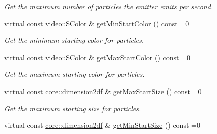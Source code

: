 \begin{DoxyCompactItemize}
\begin{DoxyCompactList}\small\item\em Get the maximum number of particles the emitter emits per second. \end{DoxyCompactList}\item 
\mbox{\label{classirr_1_1scene_1_1IParticleEmitter_a919f23add74b59c88a6c72b417d187e2}} 
virtual const \hyperlink{classirr_1_1video_1_1SColor}{video\+::\+S\+Color} \& \hyperlink{classirr_1_1scene_1_1IParticleEmitter_a919f23add74b59c88a6c72b417d187e2}{get\+Min\+Start\+Color} () const =0
\begin{DoxyCompactList}\small\item\em Get the minimum starting color for particles. \end{DoxyCompactList}\item 
\mbox{\label{classirr_1_1scene_1_1IParticleEmitter_a898736e31071bb5bfdb806e4c892eb01}} 
virtual const \hyperlink{classirr_1_1video_1_1SColor}{video\+::\+S\+Color} \& \hyperlink{classirr_1_1scene_1_1IParticleEmitter_a898736e31071bb5bfdb806e4c892eb01}{get\+Max\+Start\+Color} () const =0
\begin{DoxyCompactList}\small\item\em Get the maximum starting color for particles. \end{DoxyCompactList}\item 
\mbox{\label{classirr_1_1scene_1_1IParticleEmitter_a89a84536dc2ddc0df4ec831f9367b187}} 
virtual const \hyperlink{namespaceirr_1_1core_a54f0e5b7416e6dce5a0f6213f00a580f}{core\+::dimension2df} \& \hyperlink{classirr_1_1scene_1_1IParticleEmitter_a89a84536dc2ddc0df4ec831f9367b187}{get\+Max\+Start\+Size} () const =0
\begin{DoxyCompactList}\small\item\em Get the maximum starting size for particles. \end{DoxyCompactList}\item 
\mbox{\label{classirr_1_1scene_1_1IParticleEmitter_a97ddc124d93f83164aa49f7b6370bc8f}} 
virtual const \hyperlink{namespaceirr_1_1core_a54f0e5b7416e6dce5a0f6213f00a580f}{core\+::dimension2df} \& \hyperlink{classirr_1_1scene_1_1IParticleEmitter_a97ddc124d93f83164aa49f7b6370bc8f}{get\+Min\+Start\+Size} () const =0

\end{DoxyCompactItemize}
